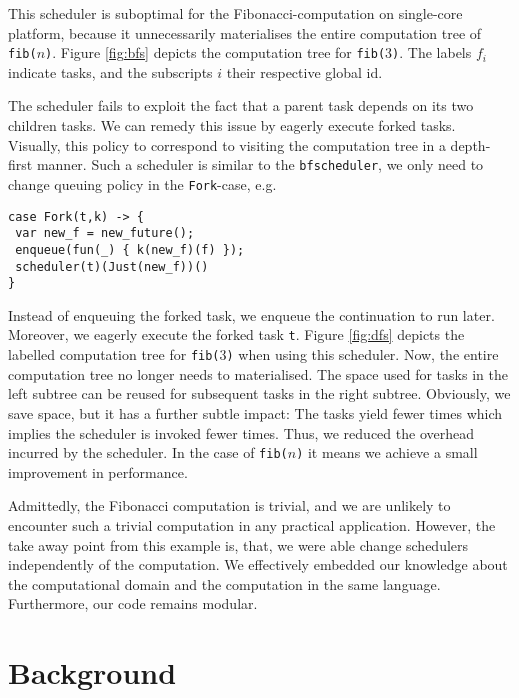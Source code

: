 \documentclass[preprint,10pt,numbers]{sigplanconf}
\begin{document}
This scheduler is suboptimal for the Fibonacci-computation on single-core platform, because it unnecessarily materialises the entire computation tree of \texttt{fib($n$)}. Figure \ref{fig:bfs} depicts the computation tree for \texttt{fib($3$)}. The labels $f_i$ indicate tasks, and the subscripts $i$ their respective global id.

The scheduler fails to exploit the fact that a parent task depends on its two children tasks. We can remedy this issue by eagerly execute forked tasks. Visually, this policy to correspond to visiting the computation tree in a depth-first manner. Such a scheduler is similar to the \texttt{bfscheduler}, we only need to change queuing policy in the \texttt{Fork}-case, e.g.
\begin{lstlisting}[style={links},caption={}]
case Fork(t,k) -> {
 var new_f = new_future();
 enqueue(fun(_) { k(new_f)(f) });
 scheduler(t)(Just(new_f))()
}
\end{lstlisting}
Instead of enqueuing the forked task, we enqueue the continuation to run later. Moreover, we eagerly execute the forked task \texttt{t}.
Figure \ref{fig:dfs} depicts the labelled computation tree for \texttt{fib($3$)} when using this scheduler. Now, the entire computation tree no longer needs to materialised. The space used for tasks in the left subtree can be reused for subsequent tasks in the right subtree. Obviously, we save space, but it has a further subtle impact: The tasks yield fewer times which implies the scheduler is invoked fewer times. Thus, we reduced the overhead incurred by the scheduler. In the case of \texttt{fib($n$)} it means we achieve a small improvement in performance.

Admittedly, the Fibonacci computation is trivial, and we are unlikely to encounter such a trivial computation in any practical application. However, the take away point from this example is, that, we were able change schedulers independently of the computation. We effectively embedded our knowledge about the computational domain and the computation in the same language. Furthermore, our code remains modular.

  \section{Background}\label{sec:background}
\end{document}
